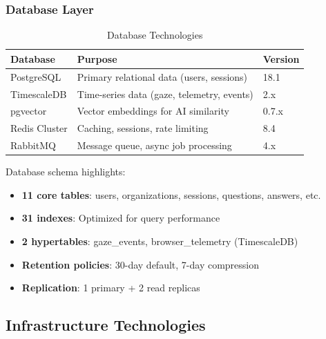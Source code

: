 \documentclass[11pt,letterpaper]{article}
\begin{document}
\subsubsection{Database Layer}

\begin{table}[H]
\centering
\begin{tabularx}{\textwidth}{lXl}
\toprule
\textbf{Database} & \textbf{Purpose} & \textbf{Version} \\
\midrule
PostgreSQL & Primary relational data (users, sessions) & 18.1 \\
TimescaleDB & Time-series data (gaze, telemetry, events) & 2.x \\
pgvector & Vector embeddings for AI similarity & 0.7.x \\
Redis Cluster & Caching, sessions, rate limiting & 8.4 \\
RabbitMQ & Message queue, async job processing & 4.x \\
\bottomrule
\end{tabularx}
\caption{Database Technologies}
\end{table}

Database schema highlights:

\begin{itemize}[noitemsep]
    \item \textbf{11 core tables}: users, organizations, sessions, questions, answers, etc.
    \item \textbf{31 indexes}: Optimized for query performance
    \item \textbf{2 hypertables}: gaze\_events, browser\_telemetry (TimescaleDB)
    \item \textbf{Retention policies}: 30-day default, 7-day compression
    \item \textbf{Replication}: 1 primary + 2 read replicas
\end{itemize}

\subsection{Infrastructure Technologies}
\end{document}
